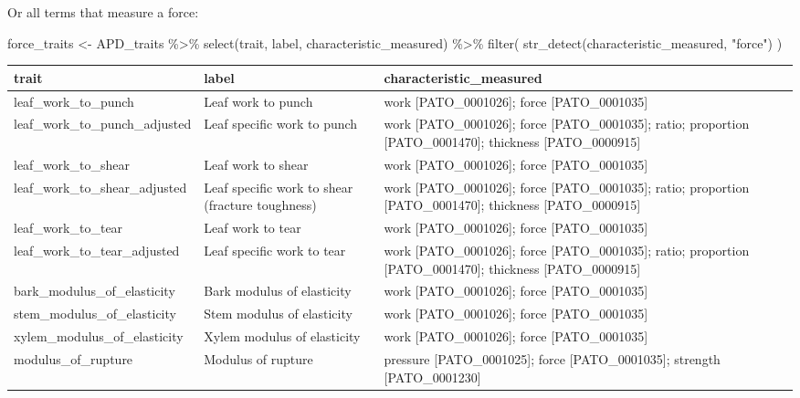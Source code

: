 \documentclass[
  letterpaper,
  DIV=11,
  numbers=noendperiod]{scrartcl}
\newenvironment{Shaded}{\begin{snugshade}}{\end{snugshade}}
\newcommand{\FunctionTok}[1]{\textcolor[rgb]{0.28,0.35,0.67}{#1}}
\newcommand{\NormalTok}[1]{\textcolor[rgb]{0.00,0.23,0.31}{#1}}
\newcommand{\OtherTok}[1]{\textcolor[rgb]{0.00,0.23,0.31}{#1}}
\newcommand{\SpecialCharTok}[1]{\textcolor[rgb]{0.37,0.37,0.37}{#1}}
\newcommand{\StringTok}[1]{\textcolor[rgb]{0.13,0.47,0.30}{#1}}
\begin{document}
Or all terms that measure a force:

\begin{Shaded}
\begin{Highlighting}[]
\NormalTok{force\_traits }\OtherTok{\textless{}{-}}
\NormalTok{  APD\_traits }\SpecialCharTok{\%\textgreater{}\%}
  \FunctionTok{select}\NormalTok{(trait, label, characteristic\_measured) }\SpecialCharTok{\%\textgreater{}\%}
  \FunctionTok{filter}\NormalTok{(}
    \FunctionTok{str\_detect}\NormalTok{(characteristic\_measured, }\StringTok{"force"}\NormalTok{) }
\NormalTok{    )}
\end{Highlighting}
\end{Shaded}

\begin{tabular}{>{\raggedright\arraybackslash}p{6cm}>{\raggedright\arraybackslash}p{5cm}>{\raggedright\arraybackslash}p{5cm}}
\toprule
trait & label & characteristic\_measured\\
\midrule
leaf\_work\_to\_punch & Leaf work to punch & work [PATO\_0001026]; force [PATO\_0001035]\\
leaf\_work\_to\_punch\_adjusted & Leaf specific work to punch & work [PATO\_0001026]; force [PATO\_0001035]; ratio; proportion [PATO\_0001470]; thickness [PATO\_0000915]\\
leaf\_work\_to\_shear & Leaf work to shear & work [PATO\_0001026]; force [PATO\_0001035]\\
leaf\_work\_to\_shear\_adjusted & Leaf specific work to shear (fracture toughness) & work [PATO\_0001026]; force [PATO\_0001035]; ratio; proportion [PATO\_0001470]; thickness [PATO\_0000915]\\
leaf\_work\_to\_tear & Leaf work to tear & work [PATO\_0001026]; force [PATO\_0001035]\\
\addlinespace
leaf\_work\_to\_tear\_adjusted & Leaf specific work to tear & work [PATO\_0001026]; force [PATO\_0001035]; ratio; proportion [PATO\_0001470]; thickness [PATO\_0000915]\\
bark\_modulus\_of\_elasticity & Bark modulus of elasticity & work [PATO\_0001026]; force [PATO\_0001035]\\
stem\_modulus\_of\_elasticity & Stem modulus of elasticity & work [PATO\_0001026]; force [PATO\_0001035]\\
xylem\_modulus\_of\_elasticity & Xylem modulus of elasticity & work [PATO\_0001026]; force [PATO\_0001035]\\
modulus\_of\_rupture & Modulus of rupture & pressure [PATO\_0001025]; force [PATO\_0001035]; strength [PATO\_0001230]\\
\bottomrule
\end{tabular}
\end{document}
